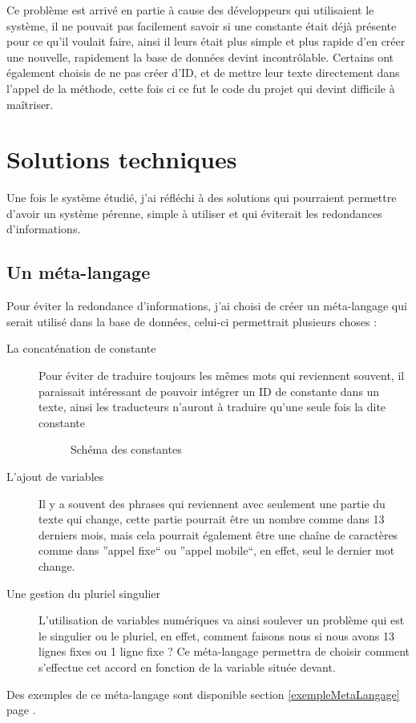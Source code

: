Ce problème est arrivé en partie à cause des développeurs qui utilisaient le système, il ne pouvait pas facilement savoir si une constante était déjà présente pour ce qu'il voulait faire, ainsi il leurs était plus simple et plus rapide d'en créer une nouvelle,
rapidement la base de données devint incontrôlable. Certains ont également choisis de ne pas créer d'ID, et de mettre leur texte directement dans l'appel de la méthode, cette fois ci ce fut le code du projet qui devint difficile à maîtriser.

\section{Solutions techniques}
	Une fois le système étudié, j'ai réfléchi à des solutions qui pourraient permettre d'avoir un système pérenne, simple à utiliser et qui éviterait les redondances d'informations.
	
	\subsection{Un méta-langage} \label{solRedondance}
	Pour éviter la redondance d'informations, j'ai choisi de créer un méta-langage qui serait utilisé dans la base de données, celui-ci permettrait plusieurs choses :
	\begin{description}
		\item[La concaténation de constante] Pour éviter de traduire toujours les mêmes mots qui reviennent souvent, il paraissait intéressant de pouvoir intégrer un ID de constante dans un texte, ainsi les traducteurs n'auront à traduire qu'une seule fois la dite constante
        \begin{figure}[H]
            \centering
            
            \caption{Schéma des constantes}
        \end{figure}
		\item [L'ajout de variables] Il y a souvent des phrases qui reviennent avec seulement une partie du texte qui change, cette partie pourrait être un nombre comme dans 13 derniers mois, mais cela pourrait également être une chaîne de
			caractères comme dans ''appel fixe`` ou ''appel mobile``, en effet, seul le dernier mot change.
		\item[Une gestion du pluriel singulier] L'utilisation de variables numériques va ainsi soulever un problème qui est le singulier ou le pluriel, en effet, comment faisons nous si nous avons 13 lignes fixes ou 1 ligne fixe ?
		Ce méta-langage permettra de choisir comment s'effectue cet accord en fonction de la variable située devant.
	\end{description}
Des exemples de ce méta-langage sont disponible section \ref{exempleMetaLangage} page \pageref{exempleMetaLangage}.

